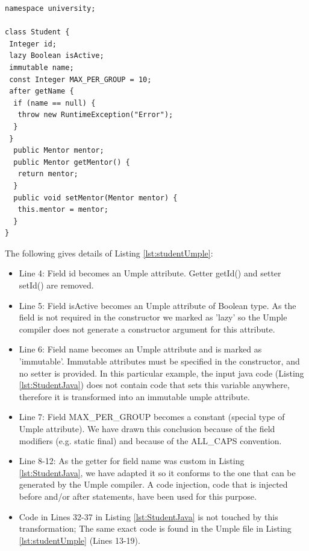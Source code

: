 \begin{lstlisting}[style=UmpleOut,caption=Student.ump,label=lst:studentUmple]
namespace university;

class Student { 
 Integer id; 
 lazy Boolean isActive; 
 immutable name; 
 const Integer MAX_PER_GROUP = 10; 
 after getName {
  if (name == null) { 
   throw new RuntimeException("Error");
  }
 }
  public Mentor mentor; 
  public Mentor getMentor() { 
   return mentor; 
  }
  public void setMentor(Mentor mentor) { 
   this.mentor = mentor; 
  } 
}
\end{lstlisting}


The following gives details of Listing \ref{lst:studentUmple}:
\begin{itemize}
\item Line 4: Field id becomes an Umple attribute. Getter getId() and setter setId() are removed.

\item Line 5: Field isActive becomes an Umple attribute of Boolean type.  As the field is not required in the constructor we marked as 'lazy' so the Umple compiler does not generate a constructor argument for this attribute. 

\item Line 6: Field name becomes an Umple attribute and is marked as 'immutable'. Immutable attributes must be specified in the constructor, and no setter is provided. In this particular example, the input java code (Listing \ref{lst:StudentJava}) does not contain code that sets this variable anywhere, therefore it is transformed into an immutable umple attribute. 

\item Line 7: Field MAX\_PER\_GROUP becomes a constant (special type of Umple attribute). We have drawn this conclusion because of the field modifiers (e.g. static final) and because of the ALL\_CAPS convention. 

\item Line 8-12: As the getter for field name was custom in Listing \ref{lst:StudentJava}, we have adapted it so it conforms to the one that can be generated by the Umple compiler. A code injection, code that is injected before and/or after statements, have been used for this purpose.

\item Code in Lines 32-37 in Listing \ref{lst:StudentJava} is not touched by this transformation; The same exact code is found in the Umple file in Listing \ref{lst:studentUmple} (Lines 13-19).

\end{itemize}

